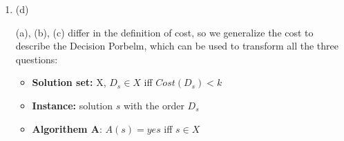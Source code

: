 \documentclass[12pt,a4paper]{article}
\makeatletter
\newtheorem*{solution}{Solution}
\theoremstyle{definition}
\renewenvironment{solution}[1][Solution] {\par\pushQED{\qed}\normalfont\topsep6\p@\@plus6\p@\relax\trivlist\item[\hskip\labelsep\bfseries#1\@addpunct{.}]\ignorespaces}{\popQED\endtrivlist\@endpefalse} \makeatother
\makeatother
\begin{document}
\begin{enumerate}
\begin{solution}
	
	(d)

	(a), (b), (c) differ in the definition of cost, so we generalize the cost to describe the Decision Porbelm, which can be used to 
	transform all the three questions:
	


\begin{itemize}
		\item \textbf{Solution set:} X, $D_s \in X$ iff $Cost(D_s) < k$
        \item \textbf{Instance:} solution $s$ with the order $D_s$
        \item \textbf{Algorithem A}: $A(s) = yes$ iff $s \in X$
	 \end{itemize}



\end{solution}



\end{enumerate}

\end{document}
